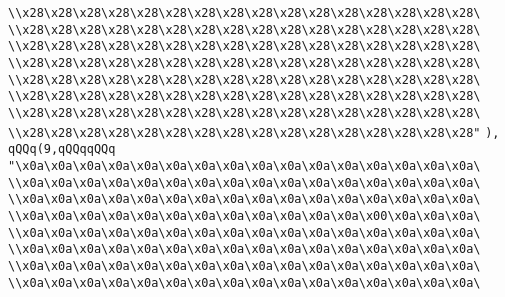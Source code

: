 \verb|\\x28\x28\x28\x28\x28\x28\x28\x28\x28\x28\x28\x28\x28\x28\x28\x28\|\newline
\verb|\\x28\x28\x28\x28\x28\x28\x28\x28\x28\x28\x28\x28\x28\x28\x28\x28\|\newline
\verb|\\x28\x28\x28\x28\x28\x28\x28\x28\x28\x28\x28\x28\x28\x28\x28\x28\|\newline
\verb|\\x28\x28\x28\x28\x28\x28\x28\x28\x28\x28\x28\x28\x28\x28\x28\x28\|\newline
\verb|\\x28\x28\x28\x28\x28\x28\x28\x28\x28\x28\x28\x28\x28\x28\x28\x28\|\newline
\verb|\\x28\x28\x28\x28\x28\x28\x28\x28\x28\x28\x28\x28\x28\x28\x28\x28\|\newline
\verb|\\x28\x28\x28\x28\x28\x28\x28\x28\x28\x28\x28\x28\x28\x28\x28\x28\|\newline
\verb|\\x28\x28\x28\x28\x28\x28\x28\x28\x28\x28\x28\x28\x28\x28\x28\x28"|\newline
\verb|),|\newline
\verb|qQQq(9,qQQqqQQq|\newline
\verb|"\x0a\x0a\x0a\x0a\x0a\x0a\x0a\x0a\x0a\x0a\x0a\x0a\x0a\x0a\x0a\x0a\|\newline
\verb|\\x0a\x0a\x0a\x0a\x0a\x0a\x0a\x0a\x0a\x0a\x0a\x0a\x0a\x0a\x0a\x0a\|\newline
\verb|\\x0a\x0a\x0a\x0a\x0a\x0a\x0a\x0a\x0a\x0a\x0a\x0a\x0a\x0a\x0a\x0a\|\newline
\verb|\\x0a\x0a\x0a\x0a\x0a\x0a\x0a\x0a\x0a\x0a\x0a\x0a\x00\x0a\x0a\x0a\|\newline
\verb|\\x0a\x0a\x0a\x0a\x0a\x0a\x0a\x0a\x0a\x0a\x0a\x0a\x0a\x0a\x0a\x0a\|\newline
\verb|\\x0a\x0a\x0a\x0a\x0a\x0a\x0a\x0a\x0a\x0a\x0a\x0a\x0a\x0a\x0a\x0a\|\newline
\verb|\\x0a\x0a\x0a\x0a\x0a\x0a\x0a\x0a\x0a\x0a\x0a\x0a\x0a\x0a\x0a\x0a\|\newline
\verb|\\x0a\x0a\x0a\x0a\x0a\x0a\x0a\x0a\x0a\x0a\x0a\x0a\x0a\x0a\x0a\x0a\|\newline
